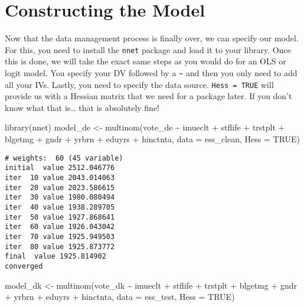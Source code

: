 \documentclass[
  letterpaper,
  DIV=11,
  numbers=noendperiod]{scrreprt}
\newenvironment{Shaded}{\begin{snugshade}}{\end{snugshade}}
\newcommand{\AttributeTok}[1]{\textcolor[rgb]{0.40,0.45,0.13}{#1}}
\newcommand{\ConstantTok}[1]{\textcolor[rgb]{0.56,0.35,0.01}{#1}}
\newcommand{\FunctionTok}[1]{\textcolor[rgb]{0.28,0.35,0.67}{#1}}
\newcommand{\NormalTok}[1]{\textcolor[rgb]{0.00,0.23,0.31}{#1}}
\newcommand{\OtherTok}[1]{\textcolor[rgb]{0.00,0.23,0.31}{#1}}
\newcommand{\SpecialCharTok}[1]{\textcolor[rgb]{0.37,0.37,0.37}{#1}}
\begin{document}
\hypertarget{constructing-the-model}{%
\chapter{Constructing the Model}\label{constructing-the-model}}

Now that the data management process is finally over, we can specify our
model. For this, you need to install the \texttt{nnet} package and load
it to your library. Once this is done, we will take the exact same steps
as you would do for an OLS or logit model. You specify your DV followed
by a \texttt{\textasciitilde{}} and then you only need to add all your
IVs. Lastly, you need to specify the data source. \texttt{Hess\ =\ TRUE}
will provide us with a Hessian matrix that we need for a package later.
If you don't know what that is\ldots{} that is absolutely fine!

\begin{Shaded}
\begin{Highlighting}[]
\FunctionTok{library}\NormalTok{(nnet)}
\NormalTok{model\_de }\OtherTok{\textless{}{-}} \FunctionTok{multinom}\NormalTok{(vote\_de }\SpecialCharTok{\textasciitilde{}}\NormalTok{ imueclt  }\SpecialCharTok{+}\NormalTok{ stflife }\SpecialCharTok{+}\NormalTok{ trstplt }\SpecialCharTok{+}\NormalTok{ blgetmg }\SpecialCharTok{+} 
\NormalTok{                    gndr }\SpecialCharTok{+}\NormalTok{ yrbrn }\SpecialCharTok{+}\NormalTok{ eduyrs }\SpecialCharTok{+}\NormalTok{ hinctnta,}
                     \AttributeTok{data =}\NormalTok{ ess\_clean,}
                     \AttributeTok{Hess =} \ConstantTok{TRUE}\NormalTok{)}
\end{Highlighting}
\end{Shaded}

\begin{verbatim}
# weights:  60 (45 variable)
initial  value 2512.046776 
iter  10 value 2043.014063
iter  20 value 2023.586615
iter  30 value 1980.080494
iter  40 value 1938.289705
iter  50 value 1927.868641
iter  60 value 1926.043042
iter  70 value 1925.949503
iter  80 value 1925.873772
final  value 1925.814902 
converged
\end{verbatim}

\begin{Shaded}
\begin{Highlighting}[]
\NormalTok{model\_dk }\OtherTok{\textless{}{-}} \FunctionTok{multinom}\NormalTok{(vote\_dk }\SpecialCharTok{\textasciitilde{}}\NormalTok{ imueclt  }\SpecialCharTok{+}\NormalTok{ stflife }\SpecialCharTok{+}\NormalTok{ trstplt }\SpecialCharTok{+}\NormalTok{ blgetmg }\SpecialCharTok{+}\NormalTok{ gndr }\SpecialCharTok{+}
\NormalTok{                     yrbrn }\SpecialCharTok{+}\NormalTok{ eduyrs }\SpecialCharTok{+}\NormalTok{ hinctnta,}
                     \AttributeTok{data =}\NormalTok{ ess\_test,}
                     \AttributeTok{Hess =} \ConstantTok{TRUE}\NormalTok{)}
\end{Highlighting}
\end{Shaded}
\end{document}
